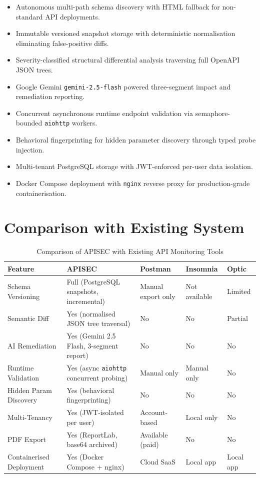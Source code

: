 \documentclass{fisatprojectfinal}
\begin{document}
\begin{itemize}
    \item Autonomous multi-path schema discovery with HTML fallback for non-standard API deployments.
    \item Immutable versioned snapshot storage with deterministic normalisation eliminating false-positive diffs.
    \item Severity-classified structural differential analysis traversing full OpenAPI JSON trees.
    \item Google Gemini \texttt{gemini-2.5-flash} powered three-segment impact and remediation reporting.
    \item Concurrent asynchronous runtime endpoint validation via semaphore-bounded \texttt{aiohttp} workers.
    \item Behavioral fingerprinting for hidden parameter discovery through typed probe injection.
    \item Multi-tenant PostgreSQL storage with JWT-enforced per-user data isolation.
    \item Docker Compose deployment with \texttt{nginx} reverse proxy for production-grade containerisation.
\end{itemize}

\section{Comparison with Existing System}

\begin{table}[H]
\centering
\caption{Comparison of APISEC with Existing API Monitoring Tools}
\label{tab:comparison_results}
\begin{tabularx}{\textwidth}{|l|X|X|X|X|}
\hline
\textbf{Feature} & \textbf{APISEC} & \textbf{Postman} & \textbf{Insomnia} & \textbf{Optic} \\
\hline
Schema Versioning & Full (PostgreSQL snapshots, incremental) & Manual export only & Not available & Limited \\
\hline
Semantic Diff & Yes (normalised JSON tree traversal) & No & No & Partial \\
\hline
AI Remediation & Yes (Gemini 2.5 Flash, 3-segment report) & No & No & No \\
\hline
Runtime Validation & Yes (async \texttt{aiohttp} concurrent probing) & Manual only & Manual only & No \\
\hline
Hidden Param Discovery & Yes (behavioral fingerprinting) & No & No & No \\
\hline
Multi-Tenancy & Yes (JWT-isolated per user) & Account-based & Local only & No \\
\hline
PDF Export & Yes (ReportLab, base64 archived) & Available (paid) & No & No \\
\hline
Containerised Deployment & Yes (Docker Compose + nginx) & Cloud SaaS & Local app & Local app \\
\hline
\end{tabularx}
\end{table}
\end{document}
